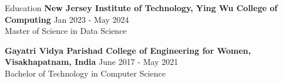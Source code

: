 \documentclass{resume} %
\begin{document}
\begin{rSection}{Education}
                        \textbf{New Jersey Institute of Technology, Ying Wu College of Computing} \hfill {Jan 2023 - May 2024} \\
                            {Master of Science in Data Science}
                         
             
         
                        \textbf{Gayatri Vidya Parishad College of Engineering for Women, Visakhapatnam, India} \hfill {June 2017 - May 2021} \\
                            {Bachelor of Technology in Computer Science}
                         
             
         
    \end{rSection}
\end{document}

